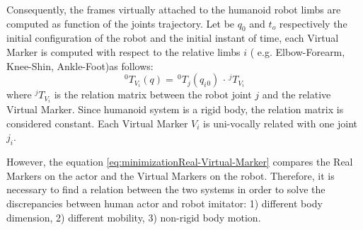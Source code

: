 \documentclass[a4paper, 10pt, conference]{ieeeconf}
\begin{document}
Consequently, the frames virtually attached to the humanoid robot limbs are computed as function of the joints trajectory. Let be $q_0$ and $t_o$ respectively the initial configuration of the robot and the initial instant of time, each Virtual Marker is computed with respect to the relative limbs $i$ ( e.g. Elbow-Forearm, Knee-Shin, Ankle-Foot)as follows:
\begin{equation}
^{0}T_{V_i}(q) = \, ^{0}T_{j}(q_i{_0}) \, \cdot \, ^{j}T_{V_i}
\label{eq:Virtual-Marker-Definition}
\end{equation}
where $^{j}T_{V_i}$ is the relation matrix between the robot joint $j$ and the relative Virtual Marker. Since humanoid system is a rigid body, the relation matrix is considered constant. Each Virtual Marker $V_i$ is uni-vocally related with one joint $j_i$.
 
However, the equation \eqref{eq:minimizationReal-Virtual-Marker} compares the Real Markers on the actor and the Virtual Markers on the robot. Therefore, it is necessary to find a relation between the two systems in order to solve the discrepancies between human actor and robot imitator: 1) different body dimension, 2) different mobility, 3) non-rigid body motion.
\end{document}
